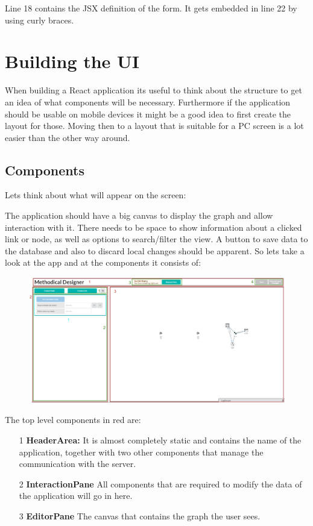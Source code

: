 Line 18 contains the JSX definition of the form. It gets embedded in line 22 by using curly braces.

\section{Building the UI}
When building a React application its useful to think about the structure to get an idea of what components will be necessary. Furthermore if the application should be usable on mobile devices it might be a good idea to first create the layout for those. Moving then to a layout that is suitable for a PC screen is a lot easier than the other way around.

\subsection{Components}
Lets think about what will appear on the screen:

The application should have a big canvas to display the graph and allow interaction with it. There needs to be space to show information about a clicked link or node, as well as options to search/filter the view. A button to save data to the database and also to discard local changes should be apparent. So lets take a look at the app and at the components it consists of:
\begin{figure}[H]
\includegraphics[scale=.46]{Bilder/Layout.png}
\end{figure}
The top level components in red are:
\begin{itemize}
\item[1] \textbf{HeaderArea:} It is almost completely static and contains the name of the application, together with two other components that manage the communication with the server.
\item[2] \textbf{InteractionPane} All components that are required to modify the data of the application will go in here.
\item[3] \textbf{EditorPane} The canvas that contains the graph the user sees.
\end{itemize}


